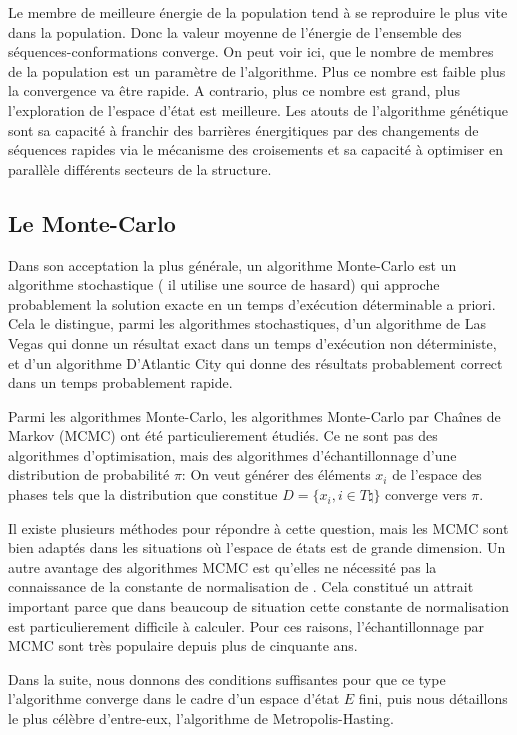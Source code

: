 Le membre de meilleure énergie de la population tend à se reproduire le plus vite dans la population. 
Donc la valeur moyenne de l'énergie de l'ensemble des séquences-conformations converge.
On peut voir ici, que le nombre de membres de la population est un paramètre de l'algorithme. Plus ce nombre est faible plus la convergence va être rapide. A contrario, plus ce nombre est grand, plus l'exploration de l'espace d'état est meilleure.
Les atouts de l'algorithme génétique sont sa capacité à franchir des barrières énergitiques par des changements de séquences rapides via le mécanisme des croisements et sa capacité à optimiser en parallèle différents secteurs de la structure.

\subsection{Le Monte-Carlo}
\label{sub:MC}
Dans son acceptation la plus générale, un algorithme Monte-Carlo est un algorithme stochastique ( il utilise une source de hasard) qui approche probablement la solution exacte en un temps d'exécution déterminable a priori. Cela le distingue, parmi les algorithmes stochastiques, d'un algorithme de Las Vegas qui donne un résultat exact dans un temps d'exécution non déterministe, et d'un algorithme D'Atlantic City qui donne des résultats probablement correct dans un temps probablement rapide.

Parmi les algorithmes Monte-Carlo, les algorithmes Monte-Carlo par Chaînes de Markov (MCMC) ont été particulierement étudiés.
Ce ne sont pas des algorithmes d'optimisation, mais des algorithmes d'échantillonnage d'une distribution de probabilité $\pi$: On veut générer des éléments $x_i$ de l'espace des phases tels que la distribution que constitue $D=\{x_i, i \in T \natural \}$ converge vers $\pi$.

Il existe plusieurs méthodes pour répondre à cette question, mais les MCMC sont bien adaptés dans les situations où l'espace de états est de grande dimension. Un autre avantage des algorithmes MCMC est qu'elles ne nécessité pas la connaissance de la constante de normalisation de \pi. Cela constitué un attrait important parce que dans beaucoup de situation cette constante de normalisation est particulierement difficile à calculer. Pour ces raisons, l'échantillonnage par MCMC sont très populaire depuis plus de cinquante ans.

Dans la suite, nous donnons des conditions suffisantes pour que ce type l'algorithme converge dans le cadre d'un espace d'état $E$ fini, puis nous détaillons le plus célèbre d'entre-eux, l'algorithme de Metropolis-Hasting.

